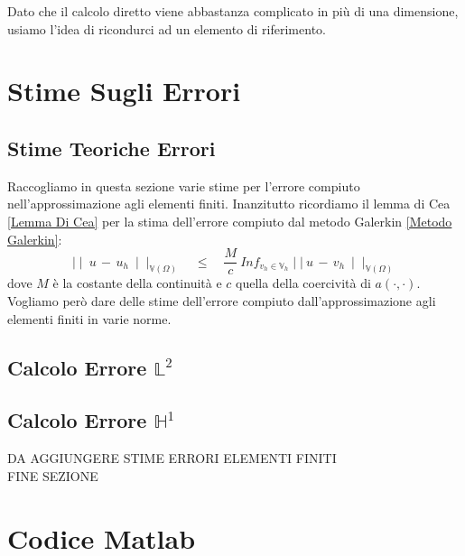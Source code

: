 \documentclass[12pt,a4paper]{report}
\theoremstyle{theorem}
\theoremstyle{definition}
\begin{document}
Dato che il calcolo diretto viene abbastanza complicato in più di una dimensione, usiamo l'idea di ricondurci ad un elemento di riferimento.


\chapter{Stime Sugli Errori}

\section{Stime Teoriche Errori}
Raccogliamo in questa sezione varie stime per l'errore compiuto nell'approssimazione agli elementi finiti. Inanzitutto ricordiamo il lemma di Cea \ref{Lemma Di Cea} per la stima dell'errore compiuto dal metodo Galerkin \ref{Metodo Galerkin}:
\[ \mid \mid \ u \, - \, u_{h} \ \mid \mid_{\mathbb{V}(\Omega)} \quad \leq \quad \frac{M}{c} \ Inf_{v_{h} \in \mathbb{V}_{h}} \mid \mid \ u \, - \, v_{h} \ \mid \mid_{\mathbb{V}(\Omega)} \]
dove $M$ è la costante della continuità e $c$ quella della coercività di $a(\cdot,\cdot)$. Vogliamo però dare delle stime dell'errore compiuto dall'approssimazione agli elementi finiti in varie norme.

\section{Calcolo Errore $\mathbb{L}^{2}$}

\section{Calcolo Errore $\mathbb{H}^{1}$}



{ \color{red} DA AGGIUNGERE STIME ERRORI ELEMENTI FINITI\\}
{ \color{blue} FINE SEZIONE\\}

\chapter{Codice Matlab}
\end{document}
